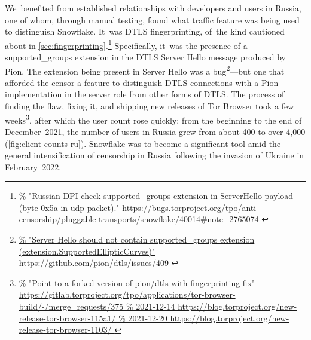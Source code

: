 \documentclass[letterpaper,twocolumn]{article}
\newlength{\urlfootnotesize}
\newcommand{\urlfootnote}[1]{\footnote{
\raggedright\hangindent\footnotemargin%
\fontsize{\urlfootnotesize}{\urlfootnotesize}\selectfont%
\url{#1}
}}
\begin{document}
We~benefited from established relationships
with developers and users in Russia,
one of whom, through manual testing,
found what traffic feature was being used to distinguish Snowflake.
It~was DTLS fingerprinting,
of~the kind cautioned about in \autoref{sec:fingerprinting}.\urlfootnote{
https://bugs.torproject.org/tpo/anti-censorship/pluggable-transports/snowflake/40014\#note_2765074
}
Specifically, it~was the presence of a
\mbox{supported\_groups} extension in the DTLS Server Hello message produced by Pion.
The extension being present in Server Hello was a bug\urlfootnote{
https://github.com/pion/dtls/issues/409
}---but
one that afforded the censor a feature
to distinguish DTLS connections with a Pion implementation in the server role
from other forms of DTLS.
The process of finding the flaw, fixing it,
and shipping new releases of Tor Browser took a few weeks\urlfootnote{
https://gitlab.torproject.org/tpo/applications/tor-browser-build/-/merge_requests/375
},
after which the user count rose quickly:
from the beginning to the end of December~2021,
the number of users in Russia grew from about 400 to over 4,000
(\autoref{fig:client-counts-ru}).
Snowflake was to become a significant tool
amid the general intensification of censorship in Russia
following the invasion of Ukraine in February~2022.
\end{document}

